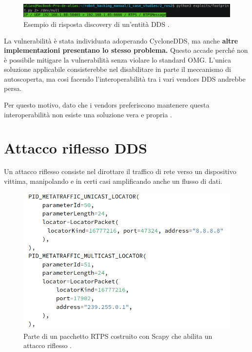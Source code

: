 \begin{figure}[H]
    \centering
    \includegraphics[width=15.2cm, keepaspectratio]{img/rispostarecoinnassance.png}
    \caption{Esempio di risposta discovery di un'entità DDS
    \cite{mayoral2022robot}.}
    \label{rispostarecoinnassance}
\end{figure}

La vulnerabilità è stata individuata adoperando 
CycloneDDS, ma anche \textbf{altre implementazioni 
presentano lo stesso problema.} 
Questo accade perché non è possibile mitigare 
la vulnerabilità senza violare lo standard 
OMG. L'unica soluzione applicabile consisterebbe 
nel disabilitare in parte il meccanismo di autoscoperta, 
ma cosi facendo l'interoperabilità tra i vari vendors 
DDS andrebbe persa. 

Per questo motivo, dato che i vendors 
preferiscono mantenere questa interoperabilità non esiste 
una soluzione vera e propria \cite{mayoral2022robot}.


\section{Attacco riflesso DDS}
Un attacco riflesso consiste nel dirottare il traffico 
di rete verso un dispositivo vittima, manipolando e in certi 
casi amplificando anche un flusso di dati.

\begin{figure}[H]
    \centering
    \includegraphics[width=13cm, keepaspectratio]{img/submessaggereflection.png}
    \caption{Parte di un pacchetto RTPS costruito con Scapy
    che abilita un attacco
    riflesso \cite{mayoral2022robot}.}
    \label{submessaggereflection}
\end{figure}

